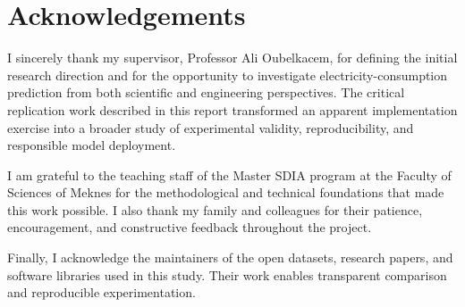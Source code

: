 \chapter*{Acknowledgements}

I sincerely thank my supervisor, Professor Ali Oubelkacem, for defining the initial research direction and for the opportunity to investigate electricity-consumption prediction from both scientific and engineering perspectives. The critical replication work described in this report transformed an apparent implementation exercise into a broader study of experimental validity, reproducibility, and responsible model deployment.

I am grateful to the teaching staff of the Master SDIA program at the Faculty of Sciences of Meknes for the methodological and technical foundations that made this work possible. I also thank my family and colleagues for their patience, encouragement, and constructive feedback throughout the project.

Finally, I acknowledge the maintainers of the open datasets, research papers, and software libraries used in this study. Their work enables transparent comparison and reproducible experimentation.
\cleardoublepage
